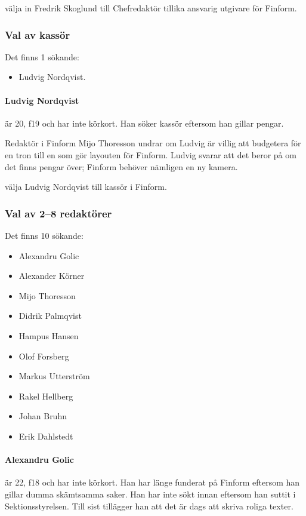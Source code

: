 \documentclass[hidelinks]{sektionsmote}
\begin{document}
\begin{beslut}
  \item välja in Fredrik Skoglund till Chefredaktör tillika ansvarig utgivare för Finform.
\end{beslut}


\subsubsection{Val av kassör}
Det finns 1 sökande:
\begin{itemize}
    \item Ludvig Nordqvist.
\end{itemize}

\paragraph{Ludvig Nordqvist} är 20, f19 och har inte körkort.
Han söker kassör eftersom han gillar pengar.

Redaktör i Finform Mijo Thoresson undrar om Ludvig är villig att budgetera för en tron till en som gör layouten för Finform.
Ludvig svarar att det beror på om det finns pengar över; Finform behöver nämligen en ny kamera.

\begin{beslut}
  \item välja Ludvig Nordqvist till kassör i Finform.
\end{beslut}


\subsubsection{Val av 2--8 redaktörer}
Det finns 10 sökande:
\begin{itemize}
    \item Alexandru Golic
    \item Alexander Körner
    \item Mijo Thoresson
    \item Didrik Palmqvist
    \item Hampus Hansen
    \item Olof Forsberg
    \item Markus Utterström
    \item Rakel Hellberg
    \item Johan Bruhn
    \item Erik Dahlstedt
\end{itemize}

\paragraph{Alexandru Golic} är 22, f18 och har inte körkort.
Han har länge funderat på Finform eftersom han gillar dumma skämtsamma saker.
Han har inte sökt innan eftersom han suttit i Sektionsstyrelsen.
Till sist tillägger han att det är dags att skriva roliga texter.
\end{document}
